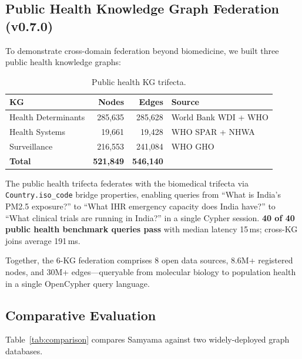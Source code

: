 \documentclass[11pt]{article}
\begin{document}
\subsection{Public Health Knowledge Graph Federation (v0.7.0)}
\label{sec:public-health}

To demonstrate cross-domain federation beyond biomedicine, we built three public health knowledge graphs:

\begin{table}[H]
  \centering
  \caption{Public health KG trifecta.}
  \label{tab:public-health}
  \begin{tabular}{@{}lrrl@{}}
    \toprule
    \textbf{KG} & \textbf{Nodes} & \textbf{Edges} & \textbf{Source} \\
    \midrule
    Health Determinants & 285,635 & 285,628 & World Bank WDI + WHO \\
    Health Systems      & 19,661  & 19,428  & WHO SPAR + NHWA \\
    Surveillance        & 216,553 & 241,084 & WHO GHO \\
    \midrule
    \textbf{Total}      & \textbf{521,849} & \textbf{546,140} & \\
    \bottomrule
  \end{tabular}
\end{table}

The public health trifecta federates with the biomedical trifecta via \texttt{Country.iso\_code} bridge properties, enabling queries from ``What is India's PM2.5 exposure?'' to ``What IHR emergency capacity does India have?'' to ``What clinical trials are running in India?'' in a single Cypher session. \textbf{40 of 40 public health benchmark queries pass} with median latency 15\,ms; cross-KG joins average 191\,ms.

Together, the 6-KG federation comprises 8 open data sources, 8.6M+ registered nodes, and 30M+ edges---queryable from molecular biology to population health in a single OpenCypher query language.

\subsection{Comparative Evaluation}
\label{sec:comparison}

Table~\ref{tab:comparison} compares Samyama against two widely-deployed graph databases.
\end{document}
